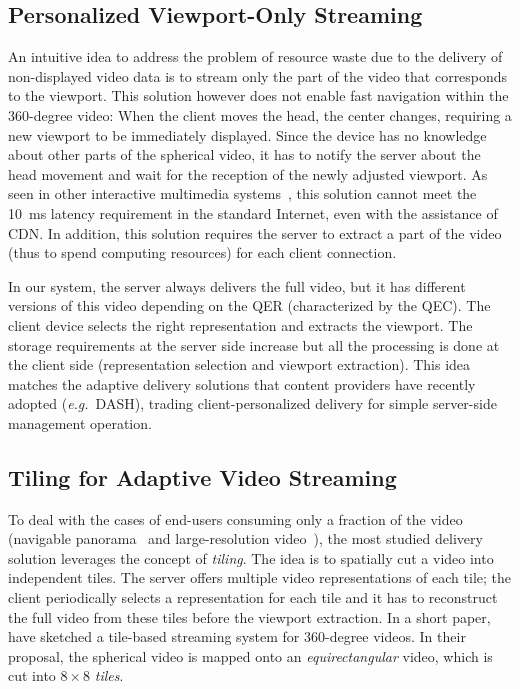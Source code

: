\subsection{Personalized Viewport-Only Streaming}

An intuitive idea to address the problem of resource waste due to the
delivery of non-displayed video data is to stream only the part of the video that
corresponds to the viewport. This solution however does not enable
fast navigation within the $360$-degree video: When the client moves the
head, the \FoV{} center changes, requiring a new viewport to be
immediately displayed. Since the device has no knowledge about other
parts of the spherical video, it has to notify the server about the
head movement and wait for the reception of the newly adjusted viewport.
As seen in other interactive multimedia
systems~\cite{ChoyWSR14}, this solution cannot meet the \SI{10}{ms} latency
requirement in the standard Internet, even with the assistance of
\ac{CDN}. In addition, this solution requires the server to extract a
part of the video (thus to spend computing resources) for each client
connection.

In our system, the server always delivers
the full video, but it has different versions of this video depending
on the \ac{QER} (characterized by the \ac{QEC}). The client device
selects the right representation and extracts the viewport. The
storage requirements at the server side increase but all the
processing is done at the client side (representation selection and
viewport extraction). This idea matches the adaptive delivery
solutions that content providers have recently adopted (\textit{e.g.}~\ac{DASH}), trading client-personalized delivery for
simple server-side management operation.

\subsection{Tiling for Adaptive Video Streaming}
To deal with the cases of end-users consuming only a fraction of the
video (navigable
panorama~\cite{sanchez_compressed_2015,wang_mixing_2014,gaddam_tiling_2015}
and large-resolution video~\cite{jean16mmsys}), the most studied delivery solution
leverages the concept
of \emph{tiling}.
The idea is to
spatially cut a video into independent tiles. The server offers
multiple video representations of each tile; the client periodically
selects a representation for each tile and it has to reconstruct the
full video from these tiles before the viewport extraction.
In a short paper,~\citet{ochi_live_2015} have sketched a
tile-based streaming system for $360$-degree videos. In their proposal,
the spherical video is mapped onto an \emph{equirectangular} video,
which is cut into $8\!\times\! 8$ \emph{tiles}.

